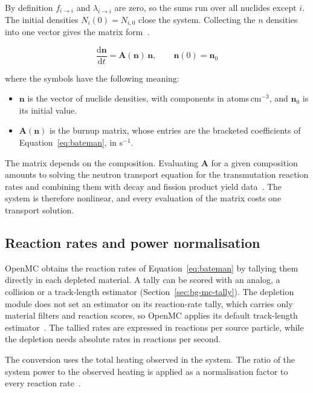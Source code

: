 By definition $f_{i\rightarrow i}$ and $\lambda_{i\rightarrow i}$ are
zero, so the sums run over all nuclides except $i$. The initial
densities $N_i(0) = N_{i,0}$ close the system. Collecting the $n$
densities into one vector gives the matrix
form~\cite{romano_2021_depletion}.

\begin{equation}
\frac{\mathrm{d}\mathbf{n}}{\mathrm{d}t} =
\mathbf{A}(\mathbf{n})\,\mathbf{n},
\qquad \mathbf{n}(0) = \mathbf{n}_0
\label{eq:bateman-matrix}
\end{equation}

\noindent where the symbols have the following meaning:

\begin{itemize}
  \item $\mathbf{n}$ is the vector of nuclide densities, with components
        in atoms\,cm$^{-3}$, and $\mathbf{n}_0$ is its initial value.

  \item $\mathbf{A}(\mathbf{n})$ is the burnup matrix, whose entries are
        the bracketed coefficients of Equation~\eqref{eq:bateman}, in
        s$^{-1}$.
\end{itemize}

The matrix depends on the composition. Evaluating $\mathbf{A}$ for a
given composition amounts to solving the neutron transport equation for
the transmutation reaction rates and combining them with decay and
fission product yield data~\cite{romano_2021_depletion}. The system is
therefore nonlinear, and every evaluation of the matrix costs one
transport solution.

\subsection{Reaction rates and power normalisation}
\label{sec:bg-dep-norm}

OpenMC obtains the reaction rates of Equation~\eqref{eq:bateman} by
tallying them directly in each depleted material. A tally can be scored
with an analog, a collision or a track-length estimator
(Section~\ref{sec:bg-mc-tally}). The depletion module does not set an
estimator on its reaction-rate tally, which carries only material
filters and reaction scores, so OpenMC applies its default track-length
estimator~\cite{romano_2021_depletion,openmc_docs}. The tallied rates are expressed in reactions per source particle, while
the depletion needs absolute rates in reactions per second.

The conversion uses the total heating observed in the system. The ratio
of the system power to the observed heating is applied as a
normalisation factor to every reaction
rate~\cite{romano_2021_depletion}.

